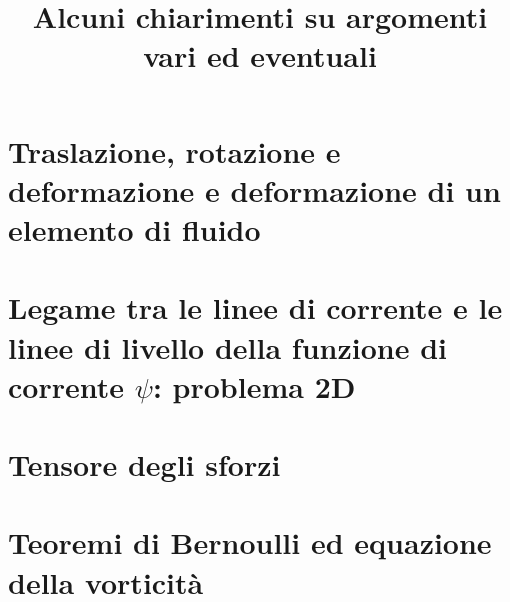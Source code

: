 \documentclass[11pt,fleqn]{article}
\title{Alcuni chiarimenti su argomenti vari ed eventuali}
\begin{document}
\maketitle

\tableofcontents


\section{Traslazione, rotazione e deformazione e deformazione di un elemento di fluido}


\section{Legame tra le linee di corrente e le linee di livello della funzione di corrente $\psi$: problema 2D}

\clearpage \newpage

\section{Tensore degli sforzi}


\section{Teoremi di Bernoulli ed equazione della vorticità}

\end{document}
